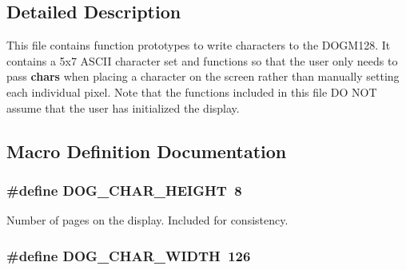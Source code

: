 \subsection{Detailed Description}
This file contains function prototypes to write characters to the D\-O\-G\-M128. It contains a 5x7 A\-S\-C\-I\-I character set and functions so that the user only needs to pass {\bfseries chars} when placing a character on the screen rather than manually setting each individual pixel. Note that the functions included in this file D\-O N\-O\-T assume that the user has initialized the display. 

\subsection{Macro Definition Documentation}
\hypertarget{group___d_o_g_m128__characters_ga9bb126e85fbda49859cd103b0ff26112}{
\subsubsection[{D\-O\-G\-\_\-\-C\-H\-A\-R\-\_\-\-H\-E\-I\-G\-H\-T}]{\setlength{\rightskip}{0pt plus 5cm}\#define D\-O\-G\-\_\-\-C\-H\-A\-R\-\_\-\-H\-E\-I\-G\-H\-T~8}}\label{group___d_o_g_m128__characters_ga9bb126e85fbda49859cd103b0ff26112}
Number of pages on the display. Included for consistency. \hypertarget{group___d_o_g_m128__characters_gad07f9ec23024de01b6d0192908ac679f}{
\subsubsection[{D\-O\-G\-\_\-\-C\-H\-A\-R\-\_\-\-W\-I\-D\-T\-H}]{\setlength{\rightskip}{0pt plus 5cm}\#define D\-O\-G\-\_\-\-C\-H\-A\-R\-\_\-\-W\-I\-D\-T\-H~126}}\label{group___d_o_g_m128__characters_gad07f9ec23024de01b6d0192908ac679f}
